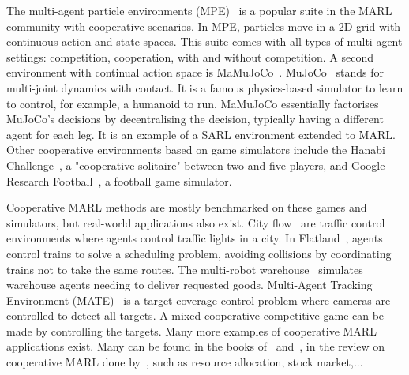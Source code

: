 
The multi-agent particle environments (MPE)~\citep{lowe2017multi} is a popular suite in the MARL community with cooperative scenarios.
In MPE, particles move in a 2D grid with continuous action and state spaces.
This suite comes with all types of multi-agent settings: competition, cooperation, with and without competition.
A second environment with continual action space is MaMuJoCo~\citep{peng2021facmac}.
MuJoCo~\citep{todorov2012mujoco} stands for multi-joint dynamics with contact.
It is a famous physics-based simulator to learn to control, for example, a humanoid to run.
MaMuJoCo essentially factorises MuJoCo's decisions by decentralising the decision, typically having a different agent for each leg.
It is an example of a SARL environment extended to MARL.
Other cooperative environments based on game simulators include the Hanabi Challenge~\citep{Bard_2020}, a "cooperative solitaire" between two and five players, and Google Research Football~\citep{kurach2020google}, a football game simulator.

Cooperative MARL methods are mostly benchmarked on these games and simulators, but real-world applications also exist.
City flow~\citep{zhang2019cityflow} are traffic control environments where agents control traffic lights in a city.
In Flatland~\citep{mohanty2020flatland}, agents control trains to solve a scheduling problem, avoiding collisions by coordinating trains not to take the same routes.
The multi-robot warehouse~\citep{papoudakis2021benchmarking, christianos2020shared} simulates warehouse agents needing to deliver requested goods.
Multi-Agent Tracking Environment (MATE)~\citep{NEURIPS2022_b2a1c152} is a target coverage control problem where cameras are controlled to detect all targets.
A mixed cooperative-competitive game can be made by controlling the targets.
Many more examples of cooperative MARL applications exist.
Many can be found in the books of~\cite{DecPomdp} and~\cite{marl-book}, in the review on cooperative MARL done by~\cite{oroojlooy2022review}, such as resource allocation, stock market,...


